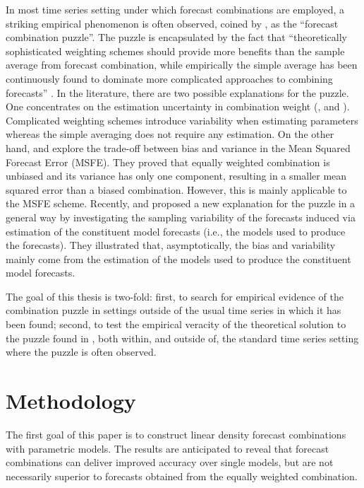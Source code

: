 \documentclass{monashthesis}
\begin{document}
In most time series setting under which forecast combinations are employed, a striking empirical phenomenon is often observed, coined by \textcite{SW04}, as the ``forecast combination puzzle''. The puzzle is encapsulated by the fact that ``theoretically sophisticated weighting schemes should provide more benefits than the sample average from forecast combination, while empirically the simple average has been continuously found to dominate more complicated approaches to combining forecasts'' \autocite{WHLK22}. In the literature, there are two possible explanations for the puzzle. One concentrates on the estimation uncertainty in combination weight (\textcite{SW98}, \textcite{SW04} and \textcite{SW09}). Complicated weighting schemes introduce variability when estimating parameters whereas the simple averaging does not require any estimation. On the other hand, \textcite{E11} and \textcite{CMVW16} explore the trade-off between bias and variance in the Mean Squared Forecast Error (MSFE). They proved that equally weighted combination is unbiased and its variance has only one component, resulting in a smaller mean squared error than a biased combination. However, this is mainly applicable to the MSFE scheme. Recently, \textcite{ZMFP22} and \textcite{FZMP23} proposed a new explanation for the puzzle in a general way by investigating the sampling variability of the forecasts induced via estimation of the constituent model forecasts (i.e., the models used to produce the forecasts). They illustrated that, asymptotically, the bias and variability mainly come from the estimation of the models used to produce the constituent model forecasts.

The goal of this thesis is two-fold: first, to search for empirical evidence of the combination puzzle in settings outside of the usual time series in which it has been found; second, to test the empirical veracity of the theoretical solution to the puzzle found in \textcite{FZMP23}, both within, and outside of, the standard time series setting where the puzzle is often observed.

\hypertarget{methodology}{%
\chapter{Methodology}\label{methodology}}

The first goal of this paper is to construct linear density forecast combinations with parametric models. The results are anticipated to reveal that forecast combinations can deliver improved accuracy over single models, but are not necessarily superior to forecasts obtained from the equally weighted combination.
\end{document}
